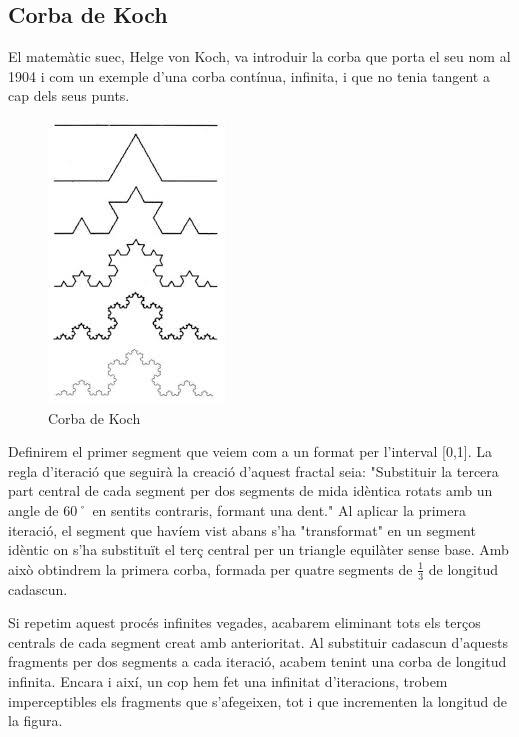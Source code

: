 \documentclass[12pt]{report}
\begin{document}
\subsection{Corba de Koch}
El matemàtic suec, Helge von Koch, va introduir la corba que porta el seu nom al 1904 i com un exemple d'una corba contínua, infinita, i que no tenia tangent a cap dels seus punts.
\begin{figure}[H]
\hspace{4,85cm}\includegraphics{koch.jpg}
\caption{Corba de Koch}
\end{figure}
Definirem el primer segment que veiem com a un format per l'interval [0,1]. La regla d'iteració que seguirà la creació d'aquest fractal seia: "Substituir la tercera part central de cada segment per dos segments de mida idèntica rotats amb un angle de 60˚ en sentits contraris, formant una dent."
\newline
Al aplicar la primera iteració, el segment que havíem vist abans s'ha "transformat" en un segment idèntic on s'ha substituït el terç central per un triangle equilàter sense base. Amb això obtindrem la primera corba, formada per quatre segments de $\frac{1}{3}$ de longitud cadascun.

Si repetim aquest procés infinites vegades, acabarem eliminant tots els terços centrals de cada segment creat amb anterioritat. Al substituir cadascun d'aquests fragments per dos segments a cada iteració, acabem tenint una corba de longitud infinita. Encara i així, un cop hem fet una infinitat d'iteracions, trobem imperceptibles els fragments que s'afegeixen, tot i que incrementen la longitud de la figura.
\end{document}
